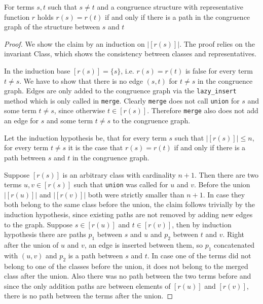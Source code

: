 \begin{invariant}[Paths]

For terms $s, t$ such that $s \neq t$ and a congruence structure with representative function $r$ holds $r(s) = r(t)$ if and only if there is a path in the congruence graph of the structure between $s$ and $t$

\end{invariant}

\begin{proof}

We show the claim by an induction on $|[r(s)]|$.
The proof relies on the invariant Class, which shows the consistency between classes and representatives.

In the induction base $[r(s)] = \{s\}$, i.e. $r(s) = r(t)$ is false for every term $t \neq s$.
We have to show that there is no edge $(s,t)$ for $t \neq s$ in the congruence graph.
Edges are only added to the congruence graph via the \texttt{lazy\_insert} method which is only called in \texttt{merge}.
Clearly \texttt{merge} does not call \texttt{union} for $s$ and some term $t \neq s$, since otherwise $t \in [r(s)]$.
Therefore \texttt{merge} also does not add an edge for $s$ and some term $t \neq s$ to the congruence graph.

Let the induction hypothesis be, that for every term $s$ such that $|[r(s)]| \leq n$, for every term $t \neq s$ it is the case that $r(s) = r(t)$ if and only if there is a path between $s$ and $t$ in the congruence graph.

Suppose $[r(s)]$ is an arbitrary class with cardinality $n+1$.
Then there are two terms $u,v \in [r(s)]$ such that \texttt{union} was called for $u$ and $v$.
Before the union $|[r(u)]|$ and $|[r(v)]|$ both were strictly smaller than $n+1$.
In case they both belong to the same class before the union, the claim follows trivially by the induction hypothesis, since existing paths are not removed by adding new edges to the graph.
Suppose $s \in [r(u)]$ and $t \in [r(v)]$, then by induction hypothesis there are paths $p_1$ between $s$ and $u$ and $p_2$ between $t$ and $v$.
Right after the union of $u$ and $v$, an edge is inserted between them, so $p_1$ concatenated with $(u,v)$ and $p_2$ is a path between $s$ and $t$.
In case one of the terms did not belong to one of the classes before the union, it does not belong to the merged class after the union.
Also there was no path between the two terms before and since the only addition paths are between elements of $[r(u)]$ and $[r(v)]$, there is no path between the terms after the union.

\end{proof}

